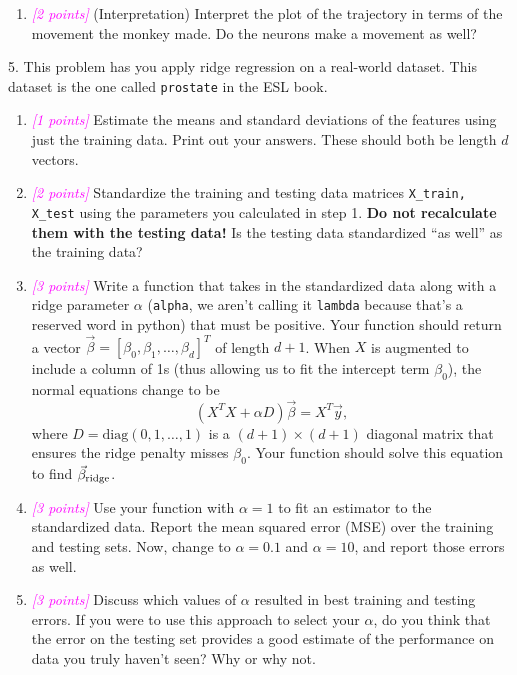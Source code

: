 \documentclass{article}
\newcommand{\points}[1]{\small\textcolor{magenta}{\emph{[#1 points]}} \normalsize}
\begin{document}
\begin{enumerate}
  Plot of the matrix $Y$ two different ways. 
  First, plot the entries (y-axis) verus time (x-axis) 
  using {\tt matplotlib.pyplot.plot}.
  
  Second, plot the {\em population trajectory}, i.e.\ plot the columns (loadings onto component 1 and 2)
  for all time points on the same axes.
  Axes should be labeled by component identity.
  Use the {\tt matplotlib.pyplot.scatter} and color the points by time (1 through 61). 
  Add a colorbar.
  \item \points{2} (Interpretation)
    Interpret the plot of the trajectory in terms of the movement the monkey made.
    Do the neurons make a movement as well?
\end{enumerate}

5.
This problem has you apply ridge regression on a real-world dataset.
This dataset is the one called {\tt prostate} 
in the ESL book.
\begin{enumerate}
\item \points{1} Estimate the means and standard deviations of the features using just the training data.
  Print out your answers. These should both be length $d$ vectors.
\item \points{2} Standardize the training and testing data matrices {\tt X\_train, X\_test}
  using the parameters you calculated in step 1. {\bf Do not recalculate them with the testing data!}
  Is the testing data standardized ``as well'' as the training data?
\item \points{3} Write a function that takes in the standardized data along with a ridge 
  parameter $\alpha$ ({\tt alpha}, we aren't calling it {\tt lambda} because that's a reserved word in python)
  that must be positive.
  Your function should return a vector $\vec \beta = [\beta_0, \beta_1, \ldots, \beta_d]^T$ of length $d +1$.
  When $X$ is augmented to include a column of 1s (thus allowing us to fit the intercept term $\beta_0$),
  the normal equations change to be
  $$
  (X^T X + \alpha D) \vec \beta = X^T \vec y,
  $$
  where $D = \mathrm{diag}(0, 1, \ldots, 1)$ is a $(d+1) \times (d+1)$ diagonal matrix that ensures
  the ridge penalty misses $\beta_0$.
  Your function should solve this equation to find $\vec \beta_{\rm ridge}$.
\item \points{3}
  Use your function with $\alpha = 1$ to fit an estimator to the standardized data.
  Report the mean squared error (MSE) over the training and testing sets.
  Now, change to $\alpha = 0.1$ and $\alpha=10$, and report those errors as well.
\item \points{3}
  Discuss which values of $\alpha$ resulted in best training and testing errors.
  If you were to use this approach to select your $\alpha$, do you think that
  the error on the testing set provides a good estimate 
  of the performance on data you truly haven't seen?
  Why or why not.
\end{enumerate}
\end{document}
